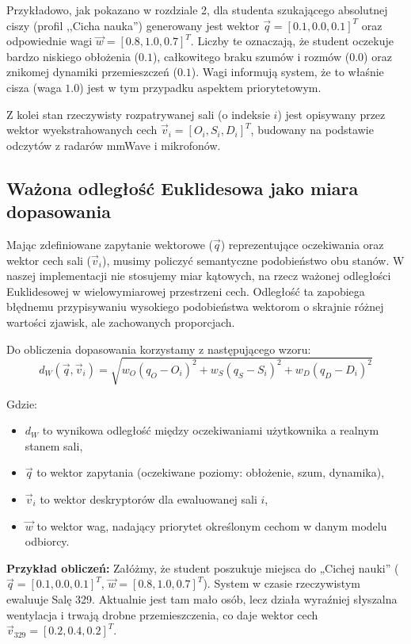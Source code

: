 \documentclass[14pt,a4paper]{extarticle}
\begin{document}
Przykładowo, jak pokazano w rozdziale 2, dla studenta szukającego absolutnej ciszy (profil ,,Cicha nauka'') generowany jest wektor $\vec{q} = [0.1, 0.0, 0.1]^T$ oraz odpowiednie wagi $\vec{w} = [0.8, 1.0, 0.7]^T$. Liczby te oznaczają, że student oczekuje bardzo niskiego obłożenia ($0.1$), całkowitego braku szumów i rozmów ($0.0$) oraz znikomej dynamiki przemieszczeń ($0.1$). Wagi informują system, że to właśnie cisza (waga $1.0$) jest w tym przypadku aspektem priorytetowym.

Z kolei stan rzeczywisty rozpatrywanej sali (o indeksie $i$) jest opisywany przez wektor wyekstrahowanych cech $\vec{v}_i = [O_i, S_i, D_i]^T$, budowany na podstawie odczytów z radarów mmWave i mikrofonów.

\subsection{Ważona odległość Euklidesowa jako miara dopasowania}
Mając zdefiniowane zapytanie wektorowe ($\vec{q}$) reprezentujące oczekiwania oraz wektor cech sali ($\vec{v}_i$), musimy policzyć semantyczne podobieństwo obu stanów. W naszej implementacji nie stosujemy miar kątowych, na rzecz ważonej odległości Euklidesowej w wielowymiarowej przestrzeni cech. Odległość ta zapobiega błędnemu przypisywaniu wysokiego podobieństwa wektorom o skrajnie różnej wartości zjawisk, ale zachowanych proporcjach.

Do obliczenia dopasowania korzystamy z następującego wzoru:
\begin{equation}
d_W(\vec{q}, \vec{v}_i) = \sqrt{w_O(q_O - O_i)^2 + w_S(q_S - S_i)^2 + w_D(q_D - D_i)^2}
\end{equation}

Gdzie:
\begin{itemize}
    \item $d_W$ to wynikowa odległość między oczekiwaniami użytkownika a realnym stanem sali,
    \item $\vec{q}$ to wektor zapytania (oczekiwane poziomy: obłożenie, szum, dynamika),
    \item $\vec{v}_i$ to wektor deskryptorów dla ewaluowanej sali $i$,
    \item $\vec{w}$ to wektor wag, nadający priorytet określonym cechom w danym modelu odbiorcy.
\end{itemize}

\textbf{Przykład obliczeń:} Załóżmy, że student poszukuje miejsca do „Cichej nauki” ($\vec{q} = [0.1, 0.0, 0.1]^T$, $\vec{w} = [0.8, 1.0, 0.7]^T$). System w czasie rzeczywistym ewaluuje Salę 329. Aktualnie jest tam mało osób, lecz działa wyraźniej słyszalna wentylacja i trwają drobne przemieszczenia, co daje wektor cech $\vec{v}_{329} = [0.2, 0.4, 0.2]^T$.
\end{document}
